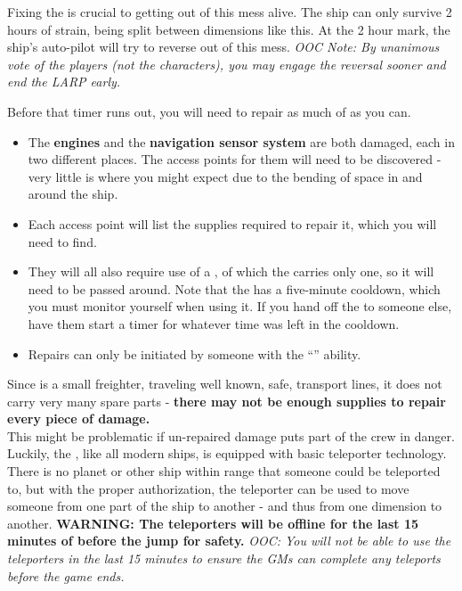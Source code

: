 \documentclass[green]{TMFHope}
\begin{document}
\name{\gFixTheShip{}}

Fixing the \pNew{} is crucial to getting out of this mess alive. The ship can only survive 2 hours of strain, being split between dimensions like this. At the 2 hour mark, the ship's auto-pilot will try to reverse out of this mess. \emph{OOC Note: By unanimous vote of the players (not the characters), you may engage the reversal sooner and end the LARP early.}

Before that timer runs out, you will need to repair as much of \pNew{} as you can. 
\begin{itemize}
  \item The \textbf{engines} and the \textbf{navigation sensor system} are both damaged, each in two different places. The access points for them will need to be discovered - very little is where you might expect due to the bending of space in and around the ship. 
  \item Each access point will list the supplies required to repair it, which you will need to find. 
	\item They will all also require use of a \textbf{\iTorch{\MYname{}}}, of which the \pNew{} carries only one, so it will need to be passed around.  Note that the \iTorch{\MYname{}} has a five-minute cooldown, which you must monitor yourself when using it.  If you hand off the \iTorch{\MYname{}} to someone else, have them start a timer for whatever time was left in the cooldown.
	\item Repairs can only be initiated by someone with the ``\aEngineering{\MYname}'' ability.
\end{itemize}
Since \pNew{} is a small freighter, traveling well known, safe, transport lines, it does not carry very many spare parts - \textbf{there may not be enough supplies to repair every piece of damage.}\\

This might be problematic if un-repaired damage puts part of the crew in danger. Luckily, the \pNew{}, like all modern ships, is equipped with basic teleporter technology. There is no planet or other ship within range that someone could be teleported to, but with the proper authorization, the teleporter can be used to move someone from one part of the ship to another - and thus from one dimension to another.  \textbf{WARNING: The teleporters will be offline for the last 15 minutes of before the jump for safety.} \emph{OOC: You will not be able to use the teleporters in the last 15 minutes to ensure the GMs can complete any teleports before the game ends.}
\end{document}
